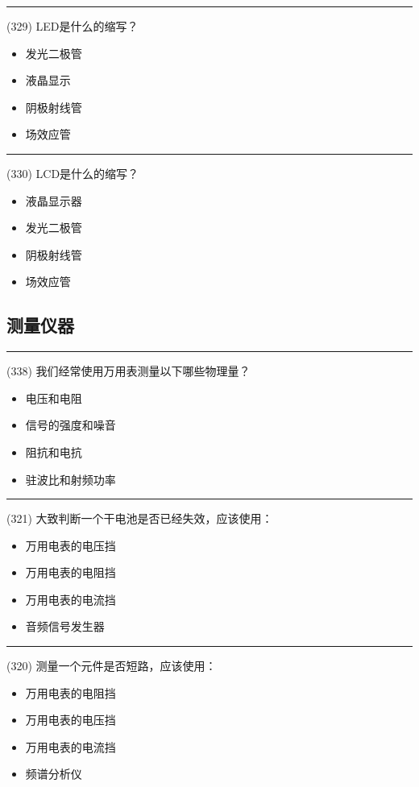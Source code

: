 \documentclass[twocolumn,hyperref,UTF8]{ctexart}  %
\begin{document}
\noindent\rule{0.5\textwidth}{1pt}
\heiti (329) LED是什么的缩写？ \songti {\color{gray} [LK1162] }
\begin{itemize}
	\item  发光二极管
	\item  液晶显示
	\item  阴极射线管
	\item  场效应管
\end{itemize}


\noindent\rule{0.5\textwidth}{1pt}
\heiti (330) LCD是什么的缩写？ \songti {\color{gray} [LK1163] }
\begin{itemize}
	\item  液晶显示器
	\item  发光二极管
	\item  阴极射线管
	\item  场效应管
\end{itemize}


\clearpage
\subsection{测量仪器}


\noindent\rule{0.5\textwidth}{1pt}
\heiti (338) 我们经常使用万用表测量以下哪些物理量？ \songti {\color{gray} [LK1196] }
\begin{itemize}
	\item  电压和电阻
	\item  信号的强度和噪音
	\item  阻抗和电抗
	\item  驻波比和射频功率
\end{itemize}


\noindent\rule{0.5\textwidth}{1pt}
\heiti (321) 大致判断一个干电池是否已经失效，应该使用： \songti {\color{gray} [LK0483] }
\begin{itemize}
	\item  万用电表的电压挡
	\item  万用电表的电阻挡
	\item  万用电表的电流挡
	\item  音频信号发生器
\end{itemize}


\noindent\rule{0.5\textwidth}{1pt}
\heiti (320) 测量一个元件是否短路，应该使用： \songti {\color{gray} [LK0482] }
\begin{itemize}
	\item  万用电表的电阻挡
	\item  万用电表的电压挡
	\item  万用电表的电流挡
	\item  频谱分析仪
\end{itemize}
\end{document}
